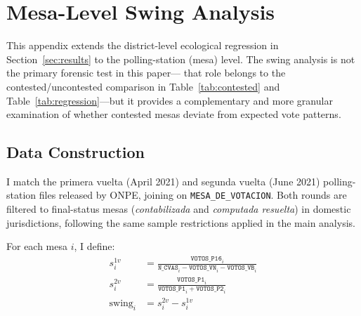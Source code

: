 \appendix
\renewcommand{\thesection}{A}
\renewcommand{\thesubsection}{A.\arabic{subsection}}
\renewcommand{\thefigure}{A\arabic{figure}}
\setcounter{figure}{0}
\renewcommand{\thetable}{A\arabic{table}}
\setcounter{table}{0}

\section{Mesa-Level Swing Analysis}
\label{app:swing}

This appendix extends the district-level ecological regression in
Section~\ref{sec:results} to the polling-station (mesa) level.
The swing analysis is not the primary forensic test in this paper---
that role belongs to the contested/uncontested comparison in
Table~\ref{tab:contested} and Table~\ref{tab:regression}---but it provides
a complementary and more granular examination of whether contested mesas
deviate from expected vote patterns.

\subsection{Data Construction}
\label{app:swing:data}

I match the primera vuelta (April 2021) and segunda vuelta (June 2021)
polling-station files released by ONPE, joining on \texttt{MESA\_DE\_VOTACION}.
Both rounds are filtered to final-status mesas (\emph{contabilizada} and
\emph{computada resuelta}) in domestic jurisdictions, following the same
sample restrictions applied in the main analysis.

For each mesa $i$, I define:
\begin{align}
  s^{1v}_{i} &= \frac{\texttt{VOTOS\_P16}_i}
                     {\texttt{N\_CVAS}_i - \texttt{VOTOS\_VN}_i
                      - \texttt{VOTOS\_VB}_i}
  \label{eq:s1v} \\[6pt]
  s^{2v}_{i} &= \frac{\texttt{VOTOS\_P1}_i}
                     {\texttt{VOTOS\_P1}_i + \texttt{VOTOS\_P2}_i}
  \label{eq:s2v} \\[6pt]
  \text{swing}_i &= s^{2v}_{i} - s^{1v}_{i}
  \label{eq:swing}
\end{align}

